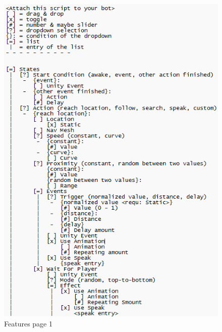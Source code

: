 \begin{figure}[H]
  \centering
  \begin{minipage}{0.45\textwidth}
    \centering
    \includegraphics[scale=0.55]{images/bot_contoller_features_1.png}
    \caption{Features page 1}
    \label{fig:bot_contoller_features_1}
  \end{minipage}
  \hfill
  \begin{minipage}{0.45\textwidth}
    \centering

\end{minipage}
\end{figure}
